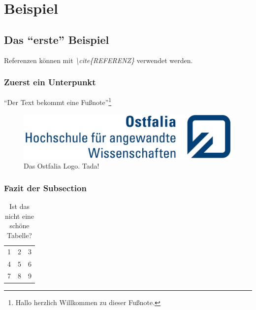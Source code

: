 \chapter{Beispiel}

\section{Das \enquote{erste} Beispiel}
Referenzen können mit \textit{\textbackslash cite\{REFERENZ\}} verwendet werden.
\cite{Martin:2008:CCH:1388398}

\subsection{Zuerst ein Unterpunkt}
\blindtext
\enquote{Der Text bekommt eine Fußnote}\footnote{Hallo herzlich Willkommen zu dieser Fußnote.}

\blindtext

\begin{figure}
	\begin{center}
		\includegraphics{Bilder/ostfalia_logo.jpg}
		\caption{Das Ostfalia Logo. Tada!}
	\end{center}
\end{figure}

\blindtext

\blindtext

\subsection{Fazit der Subsection}
\blindtext

\blindtext
\cite{Prevezanos2013}
\cite{mehta2020covid}

\blindtext

\begin{table}
	\begin{center}
		\begin{tabular}{| l c r |}
			\hline
			1 & 2 & 3 \\
			4 & 5 & 6 \\
			7 & 8 & 9 \\
			\hline
		\end{tabular}
	\end{center}
	\caption{Ist das nicht eine schöne Tabelle?}
\end{table}

